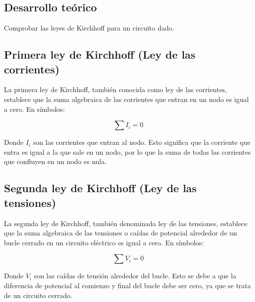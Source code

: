 \documentclass{article}
\begin{document}

\begin{multicols}{2}
\section{Desarrollo teórico}\label{Desarrollo Teorico}                              	%
Comprobar las leyes de Kirchhoff para un circuito dado.
\cite{Latam}
\subsection{Primera ley de Kirchhoff (Ley de las corrientes)}

La primera ley de Kirchhoff, también conocida como ley de las corrientes, establece que la suma algebraica de las corrientes que entran en un nodo es igual a cero. En símbolos:

\begin{equation}
\sum I_i = 0
\end{equation}

Donde $I_i$ son las corrientes que entran al nodo. Esto significa que la corriente que entra es igual a la que sale en un nodo, por lo que la suma de todas las corrientes que confluyen en un nodo es nula.

\subsection{Segunda ley de Kirchhoff (Ley de las tensiones)}

La segunda ley de Kirchhoff, también denominada ley de las tensiones, establece que la suma algebraica de las tensiones o caídas de potencial alrededor de un bucle cerrado en un circuito eléctrico es igual a cero. En símbolos:

\begin{equation}
\sum V_i = 0
\end{equation}

Donde $V_i$ son las caídas de tensión alrededor del bucle. Esto se debe a que la diferencia de potencial al comienzo y final del bucle debe ser cero, ya que se trata de un circuito cerrado.

\end{multicols}
\end{document}
